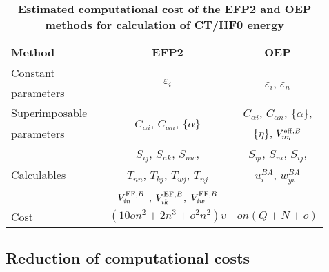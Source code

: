 %
{
\renewcommand{\arraystretch}{1.4}
\begin{table}[t]
\caption[Estimated computational cost of the EFP2 and OEP methods for calculation of CT/HF0 energy]
{{\bf Estimated computational cost of the EFP2 and OEP methods for calculation of CT/HF0 energy\footnotemark[1]}
}
\label{t:oep-costs}
\begin{ruledtabular}
\begin{tabular}{lccc}
Method     && EFP2 & OEP \\
\hline
Constant   && \multirow{2}{*}{$\varepsilon_i$} 
            & \multirow{2}{*}{$\varepsilon_i$, $\varepsilon_n$} \\
parameters && & \\
\hline
Superimposable  && \multirow{2}{*}{$C_{\alpha i}$, $C_{\alpha n}$, $\{\alpha\}$} 
            & $C_{\alpha i}$, $C_{\alpha n}$, $\{\alpha\}$, \\
parameters && & $\{\eta\}$, $V_{n\eta}^{{\rm eff},B}$ \\
\hline
\multirow{3}{*}{Calculables} 
           && $S_{ij}$, $S_{nk}$, $S_{nw}$,            &   $S_{\eta i}$, $S_{ni}$, $S_{ij}$, \\
           && $T_{nn}$, $T_{kj}$, $T_{wj}$, $T_{nj}$   &  $u_i^{BA}$, $w_{yi}^{BA}$ \\
           && $V_{in}^{{\rm EF},B}$ , $V_{ik}^{{\rm EF},B}$, $V_{iw}^{{\rm EF},B}$
                                                       & \\
\hline
Cost       && $(10on^2 + 2n^3 + o^2n^2)v$ & $on(Q+N+o)$ \\ 
\end{tabular}
\end{ruledtabular}
%
%
\end{table}
}
%


\subsection{\label{ss:5.2.cost}Reduction of computational costs}

